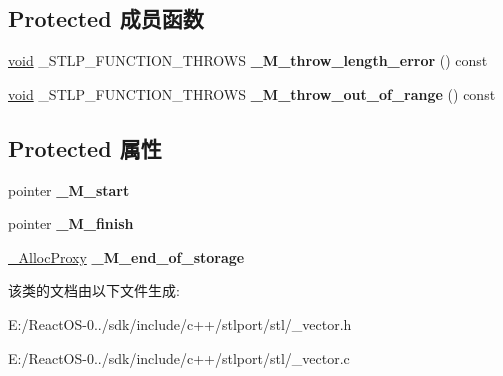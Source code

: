 \subsection*{Protected 成员函数}
\begin{DoxyCompactItemize}
\item 
\mbox{\label{class___vector__base_a1efb5274ae1fabaac461c2f7c623575d}} 
\hyperlink{interfacevoid}{void} \+\_\+\+S\+T\+L\+P\+\_\+\+F\+U\+N\+C\+T\+I\+O\+N\+\_\+\+T\+H\+R\+O\+WS {\bfseries \+\_\+\+M\+\_\+throw\+\_\+length\+\_\+error} () const
\item 
\mbox{\label{class___vector__base_a85a519c691d74f3179e85d89ac4b74df}} 
\hyperlink{interfacevoid}{void} \+\_\+\+S\+T\+L\+P\+\_\+\+F\+U\+N\+C\+T\+I\+O\+N\+\_\+\+T\+H\+R\+O\+WS {\bfseries \+\_\+\+M\+\_\+throw\+\_\+out\+\_\+of\+\_\+range} () const
\end{DoxyCompactItemize}
\subsection*{Protected 属性}
\begin{DoxyCompactItemize}
\item 
\mbox{\label{class___vector__base_ada4993004af300bb721f75a68c10b0e9}} 
pointer {\bfseries \+\_\+\+M\+\_\+start}
\item 
\mbox{\label{class___vector__base_a373a99af675d55e660f7e9960cd30a73}} 
pointer {\bfseries \+\_\+\+M\+\_\+finish}
\item 
\mbox{\label{class___vector__base_a30b320d236ce211f52a1e02aa7e8d5d1}} 
\hyperlink{class___s_t_l_p__alloc__proxy}{\+\_\+\+Alloc\+Proxy} {\bfseries \+\_\+\+M\+\_\+end\+\_\+of\+\_\+storage}
\end{DoxyCompactItemize}


该类的文档由以下文件生成\+:\begin{DoxyCompactItemize}
\item 
E\+:/\+React\+O\+S-\/0../sdk/include/c++/stlport/stl/\+\_\+vector.\+h\item 
E\+:/\+React\+O\+S-\/0../sdk/include/c++/stlport/stl/\+\_\+vector.\+c\end{DoxyCompactItemize}
